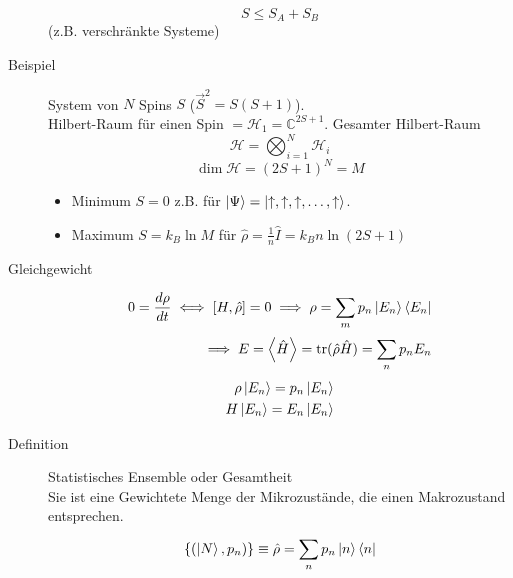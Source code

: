 \documentclass[11pt]{article}
\theoremstyle{plain}
\theoremstyle{mytheoremstyle}
\newcommand{\C}{\mathbb{C}}
\newcommand{\trace}{\operatorname{tr}}
\begin{document}
\begin{description}
  \[ S \le S_A + S_B \] (z.B. verschr\"ankte Systeme)
\item[Beispiel] System von $N$ Spins $S$ ($\vec{S}^2 =  S(S+1)$). \\
  Hilbert-Raum f\"ur einen Spin $= \mathcal{H}_1 = \C^{2S+1}$.
  Gesamter Hilbert-Raum \[ \mathcal{H} = \bigotimes_{i=1}^{N} \mathcal{H}_i \] 
  \[ \operatorname{dim} \mathcal{H} = (2S+1)^N = M \] 
  \begin{itemize}
    \item Minimum $S=0$ z.B. f\"ur $\Ket{\Psi} = \Ket{ \uparrow, \uparrow, \uparrow, \ldots, \uparrow}$.
    \item Maximum $S= k_B \ln{M}$ f\"ur $\hat{\rho}= \frac{1}{n} \hat{I}=
      k_B n \ln{(2S+1)}$
  \end{itemize}
\item[Gleichgewicht]
  \begin{align*}
    0= \frac{d \rho }{dt} \iff \left[ H, \hat{\rho} \right]=0 \implies 
    \rho = \sum_{m}^{} p_n \Ket{E_n} \Bra{E_n} \\
    \implies E = \Braket{\hat{H}} = \trace (\hat{\rho} \hat{H})
    = \sum_{n}^{} p_n E_n
  \end{align*}
  \begin{align*}
    \rho \Ket{E_n} = p_n \Ket{E_n} \\
    H \Ket{E_n} = E_n \Ket{E_n}
  \end{align*}
\end{description}
\begin{description}
  \item[Definition]  Statistisches Ensemble oder Gesamtheit \\
    Sie ist eine Gewichtete Menge der Mikrozust\"ande, die einen 
    Makrozustand entsprechen.
    \begin{align*}
      \left\{ ( \Ket{N}, p_n) \right\} \equiv \hat{\rho} = \sum_{n}^{} p_n
      \Ket{n} \Bra{n} 
    \end{align*}
\end{description}
\end{document}
